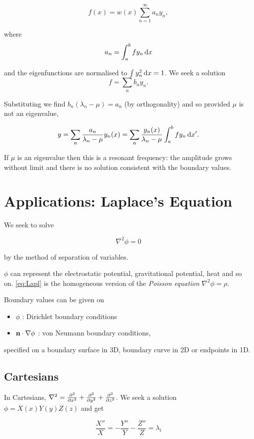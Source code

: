 \documentclass{notes}
\theoremstyle{plain}
\begin{document}
\[
f(x) = w(x) \sum_{n=1}^\infty a_n y_n,
\]

where
\[
a_n = \int_a^b f y_n\, \mathrm{d} x
\]

and the eigenfunctions are normalised to $\int y_n^2\, \mathrm{d} x = 1$.  We
seek a solution
\[
f = \sum_n b_n y_n.
\]

Substituting we find $b_n (\lambda_n - \mu) = a_n$ (by orthogonality)
and so provided $\mu$ is not an eigenvalue,

\[
y = \sum_n \frac{a_n}{\lambda_n - \mu} y_n(x)
= \sum_n \frac{y_n(x)}{\lambda_n - \mu} \int_a^b f y_n\, \mathrm{d} x'.
\]

If $\mu$ is an eigenvalue then this is a resonant frequency: the
amplitude grows without limit and there is no solution consistent with
the boundary values.

\chapter{Applications: Laplace's Equation}

We seek to solve

\begin{equation}\label{eq:Lapl}
\nabla^2 \phi = 0
\end{equation}

by the method of separation of variables.

$\phi$ can represent the electrostatic potential, gravitational
potential, heat and so on.  \eqref{eq:Lapl} is the homogeneous version
of the \emph{Poisson equation} $\nabla^2 \phi = \rho$.

Boundary values can be given on

\begin{itemize}
\item $\phi$ : Dirichlet boundary conditions
\item $\mathbf{n} \cdot \nabla \phi$ : von Neumann boundary conditions,
\end{itemize}

specified on a boundary surface in 3D, boundary curve in 2D or
endpoints in 1D.

\section{Cartesians}

In Cartesians, $\nabla^2 = \frac{\partial ^2}{\partial x^2} + \frac{\partial ^2}{\partial y^2} +
\frac{\partial ^2}{\partial z^2}$.  We seek a solution $\phi = X(x) Y(y) Z(z)$ and get

\[
\frac{X''}{X} = - \frac{Y''}{Y} - \frac{Z''}{Z} = \lambda_l
\]
\end{document}
